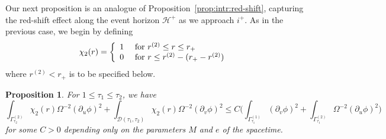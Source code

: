 \documentclass[12 pt, reqno]{amsart}
\newtheorem{proposition}[theorem]{Proposition}
\theoremstyle{definition}
\theoremstyle{remark}
\numberwithin{equation}{section}
\newcommand{\rd}{\partial}
\newcommand{\bb}{\Big}
\newcommand{\0}{\emptyset}
\newcommand{\Gmm}{\Gamma}
\newcommand{\Omg}{\Omega}
\newcommand{\calD}{\mathcal D}
\newcommand{\calH}{\mathcal H}
\begin{document}
Our next proposition is an analogue of Proposition~\ref{prop:intr:red-shift}, capturing the red-shift effect along the event horizon $\calH^{+}$ as we approach $i^{+}$. As in the previous case, we begin by defining
\begin{equation*}
	\chi_{2}(r) = \left\{
\begin{array}{cl}	
	1 & \hbox{ for } r^{(2)} \leq r \leq r_{+} \\
	0 & \hbox{ for } r \leq r^{(2)} - (r_{+} - r^{(2)}) 
\end{array} \right.
\end{equation*}
where $r^{(2)} < r_{+} $ is to be specified below.

\begin{proposition} \label{prop:intr:red-shift:EH}
For $1 \leq \tau_{1} \leq \tau_{2}$, we have
\begin{equation} \label{eq:intr:red-shift:EH}
	\int_{\Gmm^{(2)}_{\tau_{2}}} \chi_{2}(r) \Omg^{-2}(\rd_{u} \phi)^{2}
	+ \int_{\calD(\tau_{1}, \tau_{2})} \chi_{2}(r) \Omg^{-2} (\rd_{v} \phi)^{2} 
	\leq  C \bb( \int_{\Gmm^{(1)}_{\tau_{1}}} (\rd_{v} \phi)^{2}
	+ \int_{\Gmm^{(2)}_{\tau_{1}}} \Omg^{-2} (\rd_{u} \phi)^{2} \bb)
\end{equation}
for some $C>0$ depending only on the parameters $M$ and $e$ of the spacetime.
\end{proposition}
\end{document}

